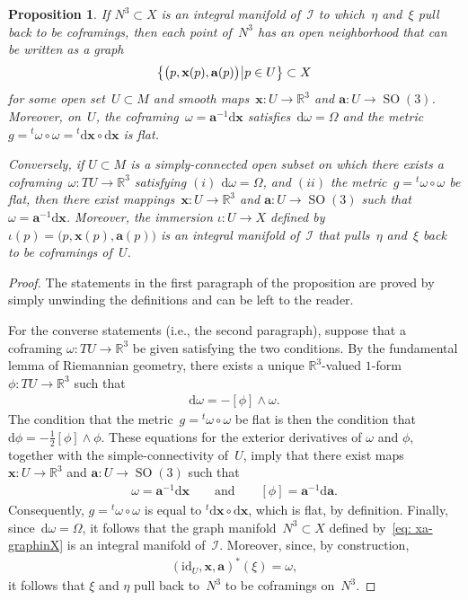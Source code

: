 \documentclass[pdftex]{sigma}
\numberwithin{equation}{section}
\newtheorem{Proposition}[Theorem]{Proposition}
 { \theoremstyle{definition}
\newtheorem{Example}[Theorem]{Example}
\newtheorem{Remark}[Theorem]{Remark} }
\renewcommand{\d}{\mathrm{d}}%
\newcommand{\cI}{{\mathcal I}}
\newcommand{\bbR}{{\mathbb R}}
\newcommand{\SO}{\operatorname{SO}}
\newcommand{\mba}{\mathbf{a}}
\newcommand{\mbx}{\mathbf{x}}
\begin{document}
\begin{Proposition}\label{prop: formulation_as_EDS} If $N^3\subset X$ is an integral manifold of~$\cI$ to which~$\eta$ and~$\xi$ pull back to be coframings, then each point of~$N^3$ has an open neighborhood that can be written as a graph
\begin{gather}\label{eq: xa-graphinX}
\bigl\{\bigl(p,\mbx(p),\mba(p)\bigr)\, \vrule \, p\in U \bigr\}\subset X
\end{gather}
for some open set~$U\subset M$ and smooth maps~$\mbx\colon U\to\mathbb{R}^3$
and $\mba\colon U\to\SO(3)$. Moreover, on~$U$,
the coframing~$\omega = \mba^{-1} \d \mbx$ satisfies~$\d\omega=\Omega$
and the metric~$g = {}^t\omega\circ \omega = {}^t\d \mbx\circ \d \mbx$ is flat.

Conversely, if $U\subset M$ is a simply-connected open subset on which there exists a coframing~$\omega\colon TU\to\bbR^3$ satisfying $(i)$ $\d\omega=\Omega$, and $(ii)$ the metric~$g={}^t\omega\circ \omega$ be flat, then there exist mappings~$\mbx\colon U\to\bbR^3$ and $\mba\colon U\to\SO(3)$ such that $\omega = \mba^{-1} \d \mbx$. Moreover, the immersion $\iota\colon U\to X$ defined by $\iota(p) = \bigl(p,\mbx(p),\mba(p)\bigr)$ is an integral manifold of~$\cI$ that pulls~$\eta$ and~$\xi$ back to be coframings of~$U$.
\end{Proposition}

\begin{proof} The statements in the first paragraph of the proposition are proved by simply unwinding the definitions and can be left to the reader.

For the converse statements (i.e., the second paragraph), suppose that a coframing $\omega\colon TU\to\bbR^3$ be given satisfying the two conditions. By the fundamental lemma of Riemannian geometry, there exists a unique $\bbR^3$-valued $1$-form~$\phi\colon TU\to\bbR^3$ such that
\begin{gather*}
\d\omega = -[\phi]\wedge\omega.
\end{gather*}
The condition that the metric~$g = {}^t\omega\circ \omega$ be flat is then the condition that~$\d\phi = -\tfrac12 [\phi]\wedge\phi$. These equations for the exterior derivatives of $\omega$ and $\phi$, together with the simple-connectivity of~$U$, imply that there exist maps~$\mbx\colon U\to\bbR^3$ and $\mba\colon U\to\SO(3)$ such that
\begin{gather}\label{flat-omega-and-phi}
\omega = \mba^{-1} \d \mbx
\qquad\text{and}\qquad
[\phi] = \mba^{-1} \d \mba.
\end{gather}
Consequently, $g = {}^t\omega\circ \omega$ is equal to ${}^t\d \mbx\circ \d \mbx$, which is flat, by definition. Finally, since~$\d\omega = \Omega$, it follows that the graph manifold~$N^3\subset X$ defined by~\eqref{eq: xa-graphinX} is an integral manifold of~$\cI$. Moreover, since, by construction,
\begin{gather*}
(\mathrm{id}_U, \mbx ,\mba)^*(\xi) = \omega,
\end{gather*}
it follows that $\xi$ and $\eta$ pull back to~$N^3$ to be coframings on~$N^3$.
\end{proof}
\end{document}
